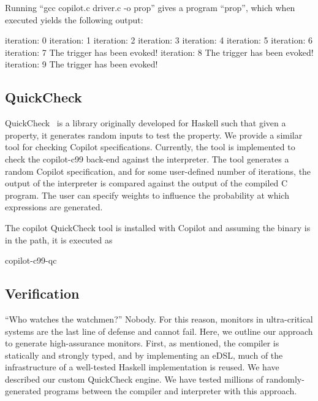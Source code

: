 \documentclass[]{article}
\theoremstyle{example}
\begin{document}
Running ``gcc copilot.c driver.c -o prop'' gives a program ``prop'', which when executed
yields the following output:
%
\begin{code}
iteration: 0
iteration: 1
iteration: 2
iteration: 3
iteration: 4
iteration: 5
iteration: 6
iteration: 7
The trigger has been evoked!
iteration: 8
The trigger has been evoked!
iteration: 9
The trigger has been evoked!
\end{code}
%

\subsection{QuickCheck}
QuickCheck~\cite{qc} is a library originally developed for Haskell such that
given a property, it generates random inputs to test the property.  We provide a
similar tool for checking Copilot specifications.  Currently, the tool is
implemented to check the copilot-c99 back-end against the interpreter.  The tool
generates a random Copilot specification, and for some user-defined number of
iterations, the output of the interpreter is compared against the output of the
compiled C program.  The user can specify weights to influence the probability
at which expressions are generated.

The copilot QuickCheck tool is installed with Copilot and assuming the binary is
in the path, it is executed as 

\begin{code}
copilot-c99-qc
\end{code}



\subsection{Verification} \label{sec:verification}
``Who watches the watchmen?''  Nobody.  For this reason, monitors in
ultra-critical systems are the last line of defense and cannot fail.  Here, we
outline our approach to generate high-assurance monitors.  First, as mentioned,
the compiler is statically and strongly typed, and by implementing an eDSL, much
of the infrastructure of a well-tested Haskell implementation is reused.  We
have described our custom QuickCheck engine.  We have tested millions of
randomly-generated programs between the compiler and interpreter with this approach.
\end{document}
